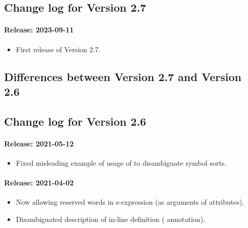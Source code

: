 \subsection{Change log for Version 2.7}

\paragraph{Release: 2023-09-11}
\begin{itemize}
\item First release of Version 2.7.
\end{itemize}

\subsection{Differences between Version 2.7 and Version 2.6}


\subsection{Change log for Version 2.6}

\paragraph{Release: 2021-05-12}
\begin{itemize}
\item Fixed misleading example of usage of  to disambiguate symbol sorts.
\end{itemize}

\paragraph{Release: 2021-04-02}
\begin{itemize}
\item Now allowing reserved words in s-expression (as arguments of attributes).
\item Disambiguated description of in-line definition ( annotation).
\end{itemize}


